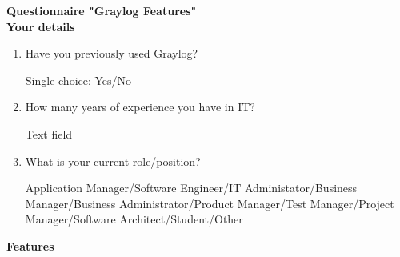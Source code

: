 \documentclass[../main.tex]{subfiles}
\begin{document}

\clearpage

\textbf{Questionnaire "Graylog Features"} \\

\textbf{Your details}

\begin{enumerate}
    \item Have you previously used Graylog? 

    Single choice: Yes/No

    \item How many years of experience you have in IT?

    Text field

    \item What is your current role/position?

    Application Manager/Software Engineer/IT Administator/Business Manager/Business Administrator/Product Manager/Test Manager/Project Manager/Software Architect/Student/Other
\end{enumerate}

\textbf{Features}
\end{document}

